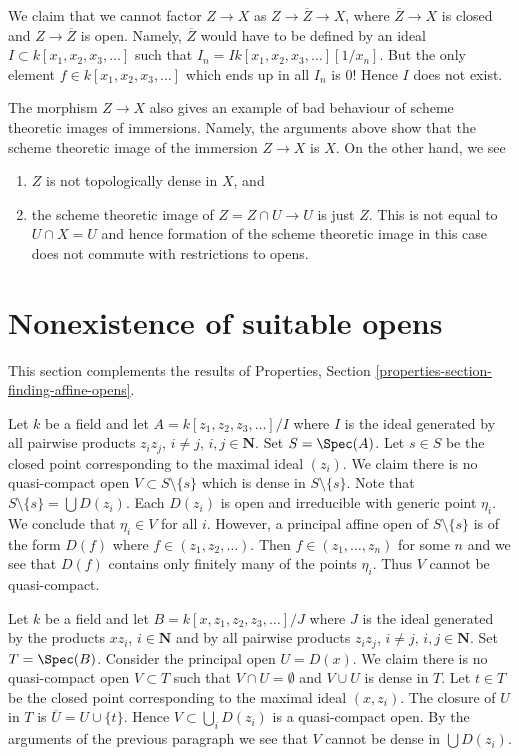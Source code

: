 \medskip\noindent
We claim that we cannot factor $Z \to X$ as
$Z \to \overline{Z} \to X$, where $\overline{Z} \to X$ is closed
and $Z \to \overline{Z}$ is open. Namely, $\overline{Z}$ would
have to be defined by an ideal $I \subset k[x_1, x_2, x_3, \ldots]$
such that $I_n = I k[x_1, x_2, x_3, \ldots][1/x_n]$.
But the only element $f \in k[x_1, x_2, x_3, \ldots]$
which ends up in all $I_n$ is $0$! Hence $I$ does not exist.

\medskip\noindent
The morphism $Z \to X$ also gives an example of bad behaviour
of scheme theoretic images of immersions. Namely, the arguments above
show that the scheme theoretic image of the immersion $Z \to X$ is $X$.
On the other hand, we see
\begin{enumerate}
\item $Z$ is not topologically dense in $X$, and
\item the scheme theoretic image of $Z = Z \cap U \to U$ is just
$Z$. This is not equal to $U \cap X = U$ and hence formation
of the scheme theoretic image in this case
does not commute with restrictions to opens.
\end{enumerate}






\section{Nonexistence of suitable opens}
\label{section-nonexistence-opens}

\noindent
This section complements the results of
Properties, Section \ref{properties-section-finding-affine-opens}.

\medskip\noindent
Let $k$ be a field and let $A = k[z_1, z_2, z_3, \ldots]/I$ where $I$
is the ideal generated by all pairwise products
$z_iz_j$, $i \not = j$, $i, j \in \mathbf{N}$. Set $S = \Spec(A)$.
Let $s \in S$ be the closed point corresponding to the maximal
ideal $(z_i)$. We claim there is no
quasi-compact open $V \subset S \setminus \{s\}$ which is
dense in $S \setminus \{s\}$. Note that $S \setminus \{s\} = \bigcup D(z_i)$.
Each $D(z_i)$ is open and irreducible with generic point
$\eta_i$. We conclude that $\eta_i \in V$ for all $i$.
However, a principal affine open of $S \setminus \{s\}$ is
of the form $D(f)$ where $f \in (z_1, z_2, \ldots)$. Then
$f \in (z_1, \ldots, z_n)$ for some $n$ and we see that $D(f)$ contains
only finitely many of the points $\eta_i$. Thus $V$ cannot be quasi-compact.

\medskip\noindent
Let $k$ be a field and let $B = k[x, z_1, z_2, z_3, \ldots]/J$ where $J$
is the ideal generated by the products $xz_i$, $i \in \mathbf{N}$ and by
all pairwise products $z_iz_j$, $i \not = j$, $i, j \in \mathbf{N}$.
Set $T = \Spec(B)$. Consider the principal open $U = D(x)$.
We claim there is no quasi-compact open $V \subset T$ such that
$V \cap U = \emptyset$ and $V \cup U$ is dense in $T$.
Let $t \in T$ be the closed point corresponding to the maximal
ideal $(x, z_i)$. The closure of $U$ in $T$ is
$\overline{U} = U \cup \{t\}$. Hence $V \subset \bigcup_i D(z_i)$
is a quasi-compact open. By the arguments of the previous paragraph
we see that $V$ cannot be dense in $\bigcup D(z_i)$.

